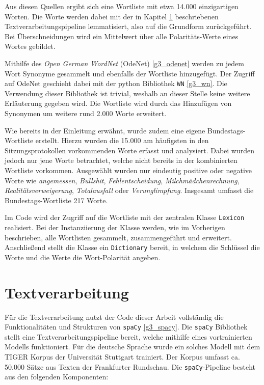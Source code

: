 Aus diesen Quellen ergibt sich eine Wortliste mit etwa 14.000 einzigartigen Worten. 
Die Worte werden dabei mit der in Kapitel \ref{g3textv} beschriebenen Textverarbeitungspipeline lemmatisiert, also auf die Grundform zurückgeführt. 
Bei Überschneidungen wird ein Mittelwert über alle Polaritäts-Werte eines Wortes gebildet. 

Mithilfe des \textit{Open German WordNet} (OdeNet) \ref{g3_odenet} werden zu jedem Wort Synonyme gesammelt und ebenfalls der Wortliste hinzugefügt. 
Der Zugriff auf OdeNet geschieht dabei mit der python Bibliothek \texttt{WN} \ref{g3_wn}. 
Die Verwendung dieser Bibliothek ist trivial, weshalb an dieser Stelle keine weitere Erläuterung gegeben wird. 
Die Wortliste wird durch das Hinzufügen von Synonymen um weitere rund 2.000 Worte erweitert. 

Wie bereits in der Einleitung erwähnt, wurde zudem eine eigene Bundestags-Wortliste erstellt. 
Hierzu wurden die 15.000 am häufigsten in den Sitzungsprotokollen vorkommenden Worte erfasst und analysiert. 
Dabei wurden jedoch nur jene Worte betrachtet, welche nicht bereits in der kombinierten Wortliste vorkommen. 
Ausgewählt wurden nur eindeutig positive oder negative Worte wie \textit{angemessen}, \textit{Bullshit}, \textit{Fehlentscheidung}, \textit{Milchmädchenrechnung}, \textit{Realitätsverweigerung}, \textit{Totalausfall} oder \textit{Verunglimpfung}. 
Insgesamt umfasst die Bundestags-Wortliste 217 Worte. 

Im Code wird der Zugriff auf die Wortliste mit der zentralen Klasse \texttt{Lexicon} realisiert. 
Bei der Instanziierung der Klasse werden, wie im Vorherigen beschrieben, alle Wortlisten gesammelt, zusammengeführt und erweitert. 
Anschließend stellt die Klasse ein \texttt{Dictionary} bereit, in welchem die Schlüssel die Worte und die Werte die Wort-Polarität angeben. 

\section{Textverarbeitung}
\label{g3textv}
Für die Textverarbeitung nutzt der Code dieser Arbeit vollständig die Funktionalitäten und Strukturen von \texttt{spaCy} \ref{g3_spacy}. 
Die \texttt{spaCy} Bibliothek stellt eine Textverarbeitungspipeline bereit, welche mithilfe eines vortrainierten Modells funktioniert. 
Für die deutsche Sprache wurde ein solches Modell mit dem TIGER Korpus der Universität Stuttgart trainiert. 
Der Korpus umfasst ca. 50.000 Sätze aus Texten der Frankfurter Rundschau. 
Die \texttt{spaCy}-Pipeline besteht aus den folgenden Komponenten: 


